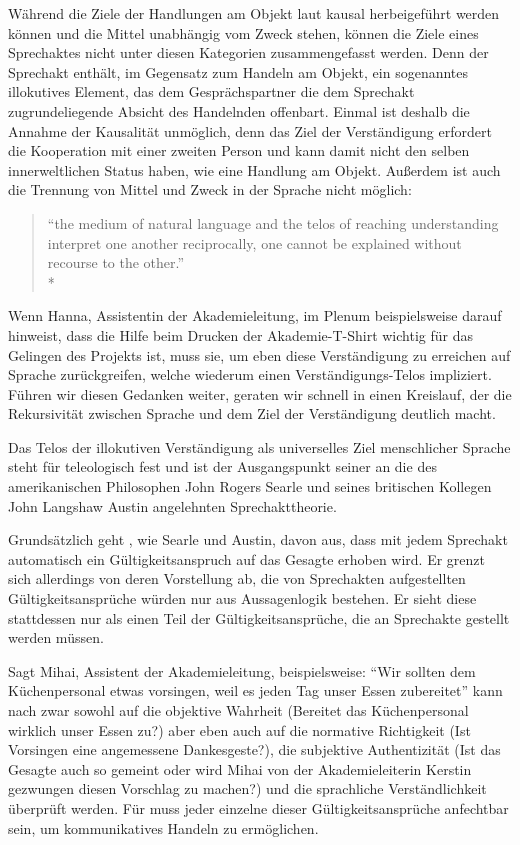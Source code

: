 Während die Ziele der Handlungen am Objekt laut \citeauthor{Habermas-1998-aa} kausal herbeigeführt werden können und die Mittel unabhängig vom Zweck stehen, können die Ziele eines Sprechaktes nicht unter diesen Kategorien zusammengefasst werden.
Denn der Sprechakt enthält, im Gegensatz zum Handeln am Objekt, ein sogenanntes illokutives Element, das dem Gesprächspartner die dem Sprechakt zugrundeliegende Absicht des Handelnden offenbart.
Einmal ist deshalb die Annahme der Kausalität unmöglich, denn das Ziel der Verständigung erfordert die Kooperation mit einer zweiten Person und kann damit nicht den selben innerweltlichen Status haben, wie eine Handlung am Objekt.
Außerdem ist auch die Trennung von Mittel und Zweck in der Sprache nicht möglich:

\begin{quote}
	``the medium of natural language and the telos of reaching understanding interpret one another reciprocally, one cannot be explained without recourse to the other.''\\*
	\textcite[218]{Habermas-1998-aa}
\end{quote}

Wenn Hanna, Assistentin der Akademieleitung, im Plenum beispielsweise darauf hinweist, dass die Hilfe beim Drucken der Akademie-T-Shirt wichtig für das Gelingen des Projekts ist, muss sie, um eben diese Verständigung zu erreichen auf Sprache zurückgreifen, welche wiederum einen Verständigungs-Telos impliziert.
Führen wir diesen Gedanken weiter, geraten wir schnell in einen Kreislauf, der die Rekursivität zwischen Sprache und dem Ziel der Verständigung deutlich macht.

Das Telos der illokutiven Verständigung als universelles Ziel menschlicher Sprache steht für \citeauthor{Habermas-1998-aa} teleologisch fest und ist der Ausgangspunkt seiner an die des amerikanischen Philosophen John Rogers Searle und seines britischen Kollegen John Langshaw Austin angelehnten Sprechakttheorie.

Grundsätzlich geht \citeauthor{Habermas-1998-aa}, wie Searle und Austin, davon aus, dass mit jedem Sprechakt automatisch ein Gültigkeitsanspruch auf das Gesagte erhoben wird.
Er grenzt sich allerdings von deren Vorstellung ab, die von Sprechakten aufgestellten Gültigkeitsansprüche würden nur aus Aussagenlogik bestehen.
Er sieht diese stattdessen nur als einen Teil der Gültigkeitsansprüche, die an Sprechakte gestellt werden müssen.

Sagt Mihai, Assistent der Akademieleitung, beispielsweise: ``Wir sollten dem Küchenpersonal etwas vorsingen, weil es jeden Tag unser Essen zubereitet'' kann nach \citeauthor{Habermas-1998-aa} zwar sowohl auf die objektive Wahrheit (Bereitet das Küchenpersonal wirklich unser Essen zu?) aber eben auch auf die normative Richtigkeit (Ist Vorsingen eine angemessene Dankesgeste?), die subjektive Authentizität (Ist das Gesagte auch so gemeint oder wird Mihai von der Akademieleiterin Kerstin gezwungen diesen Vorschlag zu machen?) und die sprachliche Verständlichkeit überprüft werden.
Für \citeauthor{Habermas-1998-aa} muss jeder einzelne dieser Gültigkeitsansprüche anfechtbar sein, um kommunikatives Handeln zu ermöglichen.

